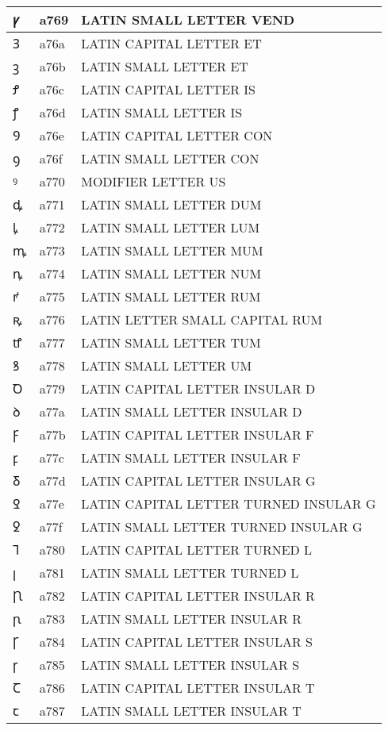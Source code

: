 \documentclass[12pt,letterpaper,openany]{book}
\begin{document}
\begin{center}
\begin{supertabular}{|m{0.25in}|m{0.5in}|m{4in}|}
ꝩ & a769 & LATIN SMALL LETTER VEND\\\hline
Ꝫ & a76a & LATIN CAPITAL LETTER ET\\\hline
ꝫ & a76b & LATIN SMALL LETTER ET\\\hline
Ꝭ & a76c & LATIN CAPITAL LETTER IS\\\hline
ꝭ & a76d & LATIN SMALL LETTER IS\\\hline
Ꝯ & a76e & LATIN CAPITAL LETTER CON\\\hline
ꝯ & a76f & LATIN SMALL LETTER CON\\\hline
ꝰ & a770 & MODIFIER LETTER US\\\hline
ꝱ & a771 & LATIN SMALL LETTER DUM\\\hline
ꝲ & a772 & LATIN SMALL LETTER LUM\\\hline
ꝳ & a773 & LATIN SMALL LETTER MUM\\\hline
ꝴ & a774 & LATIN SMALL LETTER NUM\\\hline
ꝵ & a775 & LATIN SMALL LETTER RUM\\\hline
ꝶ & a776 & LATIN LETTER SMALL CAPITAL RUM\\\hline
ꝷ & a777 & LATIN SMALL LETTER TUM\\\hline
ꝸ & a778 & LATIN SMALL LETTER UM\\\hline
Ꝺ & a779 & LATIN CAPITAL LETTER INSULAR D\\\hline
ꝺ & a77a & LATIN SMALL LETTER INSULAR D\\\hline
Ꝼ & a77b & LATIN CAPITAL LETTER INSULAR F\\\hline
ꝼ & a77c & LATIN SMALL LETTER INSULAR F\\\hline
Ᵹ & a77d & LATIN CAPITAL LETTER INSULAR G\\\hline
Ꝿ & a77e & LATIN CAPITAL LETTER TURNED INSULAR G\\\hline
ꝿ & a77f & LATIN SMALL LETTER TURNED INSULAR G\\\hline
Ꞁ & a780 & LATIN CAPITAL LETTER TURNED L\\\hline
ꞁ & a781 & LATIN SMALL LETTER TURNED L\\\hline
Ꞃ & a782 & LATIN CAPITAL LETTER INSULAR R\\\hline
ꞃ & a783 & LATIN SMALL LETTER INSULAR R\\\hline
Ꞅ & a784 & LATIN CAPITAL LETTER INSULAR S\\\hline
ꞅ & a785 & LATIN SMALL LETTER INSULAR S\\\hline
Ꞇ & a786 & LATIN CAPITAL LETTER INSULAR T\\\hline
ꞇ & a787 & LATIN SMALL LETTER INSULAR T\\\hline

\end{supertabular}
\end{center}
\end{document}
